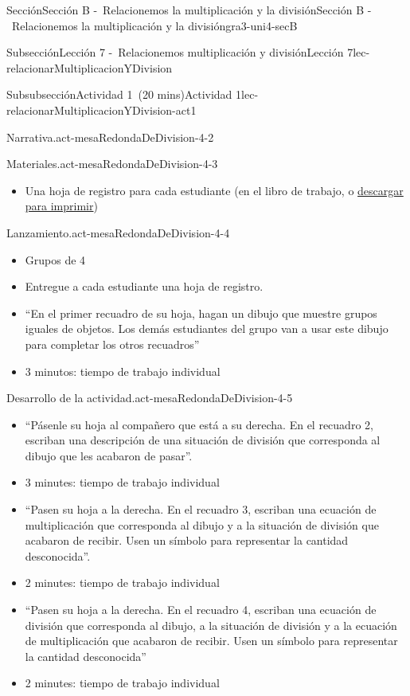\documentclass[oneside,10pt,]{article}
\begin{document}
\begin{sectionptx}{Sección}{Sección B -~Relacionemos la multiplicación y la división}{}{Sección B -~Relacionemos la multiplicación y la división}{}{}{gra3-uni4-secB}
\begin{subsectionptx}{Subsección}{Lección 7 -~Relacionemos multiplicación y división}{}{Lección 7}{}{}{lec-relacionarMultiplicacionYDivision}
\begin{subsubsectionptx}{Subsubsección}{Actividad 1~(20 mins)}{}{Actividad 1}{}{}{lec-relacionarMultiplicacionYDivision-act1}
\begin{paragraphs}{Narrativa.}{act-mesaRedondaDeDivision-4-2}
\end{paragraphs}%
\begin{paragraphs}{Materiales.}{act-mesaRedondaDeDivision-4-3}%
%
\begin{itemize}[label=\textbullet]
\item{}Una hoja de registro para cada estudiante (en el libro de trabajo, o \href{external/blm/pdf-source/mesa-redonda-de-division.pdf}{descargar para imprimir}\footnotemark{})%
\end{itemize}
\end{paragraphs}%
\begin{paragraphs}{Lanzamiento.}{act-mesaRedondaDeDivision-4-4}%
%
\begin{itemize}[label=\textbullet]
\item{}Grupos de 4%
\item{}Entregue a cada estudiante una hoja de registro.%
\item{}``En el primer recuadro de su hoja, hagan un dibujo que muestre grupos iguales de objetos. Los demás estudiantes del grupo van a usar este dibujo para completar los otros recuadros''%
\item{}3 minutos: tiempo de trabajo individual%
\end{itemize}
\end{paragraphs}%
\begin{paragraphs}{Desarrollo de la actividad.}{act-mesaRedondaDeDivision-4-5}%
%
\begin{itemize}[label=\textbullet]
\item{}``Pásenle su hoja al compañero que está a su derecha. En el recuadro 2, escriban una descripción de una situación de división que corresponda al dibujo que les acabaron de pasar''.%
\item{}3 minutes: tiempo de trabajo individual%
\item{}``Pasen su hoja a la derecha. En el recuadro 3, escriban una ecuación de multiplicación que corresponda al dibujo y a la situación de división que acabaron de recibir. Usen un símbolo para representar la cantidad desconocida''.%
\item{}2 minutes: tiempo de trabajo individual%
\item{}``Pasen su hoja a la derecha. En el recuadro 4, escriban una ecuación de división que corresponda al dibujo, a la situación de división y a la ecuación de multiplicación que acabaron de recibir. Usen un símbolo para representar la cantidad desconocida''%
\item{}2 minutes: tiempo de trabajo individual%

\end{itemize}
\end{paragraphs}
\end{subsubsectionptx}
\end{subsectionptx}
\end{sectionptx}
\end{document}
